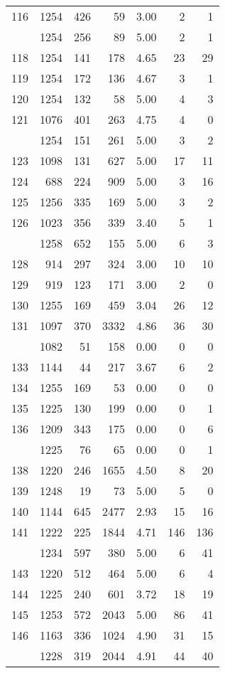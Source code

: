 \documentclass[
]{article}
\begin{document}
\begin{table}
\begin{tabular}[t]{lrrrrrr}
116 & 1254 & 426 & 59 & 3.00 & 2 & 1\\
\addlinespace
117 & 1254 & 256 & 89 & 5.00 & 2 & 1\\
118 & 1254 & 141 & 178 & 4.65 & 23 & 29\\
119 & 1254 & 172 & 136 & 4.67 & 3 & 1\\
120 & 1254 & 132 & 58 & 5.00 & 4 & 3\\
121 & 1076 & 401 & 263 & 4.75 & 4 & 0\\
\addlinespace
122 & 1254 & 151 & 261 & 5.00 & 3 & 2\\
123 & 1098 & 131 & 627 & 5.00 & 17 & 11\\
124 & 688 & 224 & 909 & 5.00 & 3 & 16\\
125 & 1256 & 335 & 169 & 5.00 & 3 & 2\\
126 & 1023 & 356 & 339 & 3.40 & 5 & 1\\
\addlinespace
127 & 1258 & 652 & 155 & 5.00 & 6 & 3\\
128 & 914 & 297 & 324 & 3.00 & 10 & 10\\
129 & 919 & 123 & 171 & 3.00 & 2 & 0\\
130 & 1255 & 169 & 459 & 3.04 & 26 & 12\\
131 & 1097 & 370 & 3332 & 4.86 & 36 & 30\\
\addlinespace
132 & 1082 & 51 & 158 & 0.00 & 0 & 0\\
133 & 1144 & 44 & 217 & 3.67 & 6 & 2\\
134 & 1255 & 169 & 53 & 0.00 & 0 & 0\\
135 & 1225 & 130 & 199 & 0.00 & 0 & 1\\
136 & 1209 & 343 & 175 & 0.00 & 0 & 6\\
\addlinespace
137 & 1225 & 76 & 65 & 0.00 & 0 & 1\\
138 & 1220 & 246 & 1655 & 4.50 & 8 & 20\\
139 & 1248 & 19 & 73 & 5.00 & 5 & 0\\
140 & 1144 & 645 & 2477 & 2.93 & 15 & 16\\
141 & 1222 & 225 & 1844 & 4.71 & 146 & 136\\
\addlinespace
142 & 1234 & 597 & 380 & 5.00 & 6 & 41\\
143 & 1220 & 512 & 464 & 5.00 & 6 & 4\\
144 & 1225 & 240 & 601 & 3.72 & 18 & 19\\
145 & 1253 & 572 & 2043 & 5.00 & 86 & 41\\
146 & 1163 & 336 & 1024 & 4.90 & 31 & 15\\
\addlinespace
147 & 1228 & 319 & 2044 & 4.91 & 44 & 40\\

\end{tabular}
\end{table}
\end{document}
